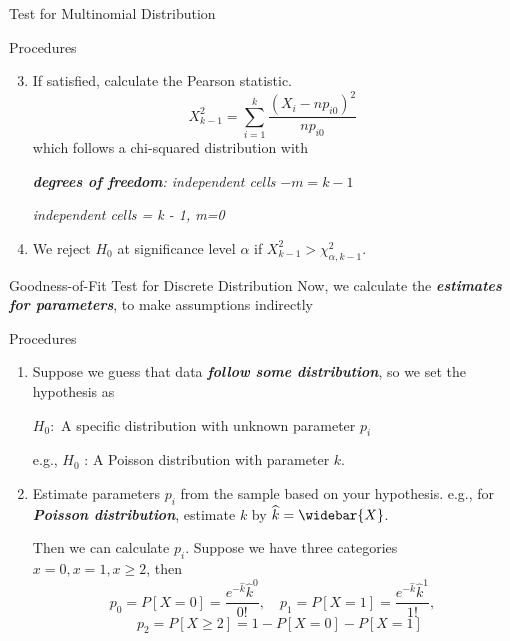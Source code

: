 \documentclass{beamer}
\newcommand{\bb}[1]{\textcolor{antiquefuchsia}{\textbf{\textit{#1}}}}
\begin{document}
\begin{frame}{Test for Multinomial Distribution}
\begin{block}{Procedures}
\begin{enumerate}
\setcounter{enumi}{2}
\item If satisfied, calculate the Pearson statistic.
$$
X_{k-1}^{2}=\sum_{i=1}^{k} \frac{\left(X_{i}-n p_{i 0}\right)^{2}}{n p_{i 0}}
$$
which follows a chi-squared distribution with 
\begin{center}
\textit{\bb{degrees of freedom}: independent cells} $-m=k-1$

\textit{independent cells = k - 1,  m=0}
\end{center}

\item We reject $H_{0}$ at significance level $\alpha$ if $X_{k-1}^{2}>\chi_{\alpha, k-1}^{2}$.
\end{enumerate}
\end{block}
\end{frame}

\begin{frame}{Goodness-of-Fit Test for Discrete Distribution}
Now, we calculate the \bb{estimates for parameters}, to make assumptions indirectly
\begin{block}{Procedures}
\begin{enumerate}
\item Suppose we guess that data \bb{follow some distribution}, so we set the hypothesis as
\begin{center}
$H_{0}:$ A specific distribution with unknown parameter $p_{i}$

e.g.,
$H_{0}$ : A Poisson distribution with parameter $k .$
\end{center}
\item Estimate parameters $p_{i}$ from the sample based on your hypothesis.
e.g., for \bb{Poisson distribution}, estimate $k$ by
$
\widehat{k}=\widebar{X}
$.

Then we can calculate $p_{i}$. Suppose we have three categories $x=0, x=1, x \geq 2$, then
$$
p_{0}=P[X=0]=\frac{e^{-\widehat{k}} \widehat{k}^{0}}{0 !}, \quad p_{1}=P[X=1]=\frac{e^{-\widehat{k}} \widehat{k}^{1}}{1 !},$$$$ \quad p_{2}=P[X \geq 2]=1-P[X=0]-P[X=1]
$$
\end{enumerate}
\end{block}
\end{frame}
\end{document}
